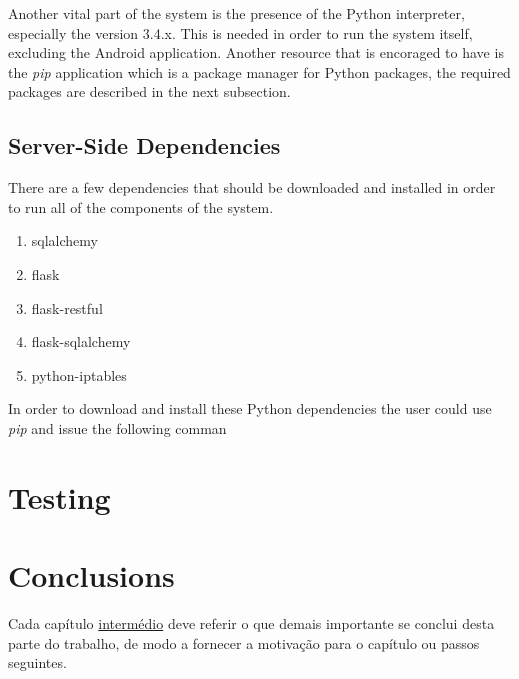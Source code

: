 Another vital part of the system is the presence of the Python interpreter,
especially the version 3.4.x. This is needed in order to run the system itself,
excluding the Android application. Another resource that is encoraged to have is
the \emph{pip} application which is a package manager for Python packages, the
required packages are described in the next subsection.

\subsection{Server-Side Dependencies}
\label{chap5:sec:inst-usg:sub:rasp-prep}
There are a few dependencies that should be downloaded and installed in order to
run all of the components of the system.

\begin{enumerate}
	\item sqlalchemy
	\item flask
	\item flask-restful
	\item flask-sqlalchemy
	\item python-iptables
\end{enumerate}

In order to download and install these Python dependencies the user could use
\emph{pip} and issue the following comman

\section{Testing}
\label{chap4:sec:testing}

\section{Conclusions}
\label{chap4:sec:concs}
Cada capítulo \underline{intermédio} deve referir o que demais importante se conclui desta parte do trabalho, de modo a fornecer a motivação para o capítulo ou passos seguintes.
